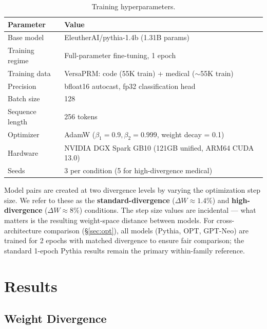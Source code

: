 \documentclass[11pt,a4paper]{article}
\begin{document}
\begin{table}[h]
\centering
\caption{Training hyperparameters.}
\label{tab:training}
\begin{tabular}{@{}ll@{}}
\toprule
\textbf{Parameter} & \textbf{Value} \\
\midrule
Base model & EleutherAI/pythia-1.4b (1.31B params) \\
Training regime & Full-parameter fine-tuning, 1 epoch \\
Training data & VersaPRM: code (55K train) + medical ($\sim$55K train) \\
Precision & bfloat16 autocast, fp32 classification head \\
Batch size & 128 \\
Sequence length & 256 tokens \\
Optimizer & AdamW ($\beta_1 = 0.9, \beta_2 = 0.999$, weight decay = 0.1) \\
Hardware & NVIDIA DGX Spark GB10 (121GB unified, ARM64 CUDA 13.0) \\
Seeds & 3 per condition (5 for high-divergence medical) \\
\bottomrule
\end{tabular}
\end{table}

Model pairs are created at two divergence levels by varying the optimization step size. We refer to these as the \textbf{standard-divergence} ($\Delta W \approx 1.4\%$) and \textbf{high-divergence} ($\Delta W \approx 8\%$) conditions. The step size values are incidental — what matters is the resulting weight-space distance between models. For cross-architecture comparison (\S\ref{sec:opt}), all models (Pythia, OPT, GPT-Neo) are trained for 2 epochs with matched divergence to ensure fair comparison; the standard 1-epoch Pythia results remain the primary within-family reference.

\section{Results}\label{sec:results}

\subsection{Weight Divergence}\label{sec:weight_div}
\end{document}
